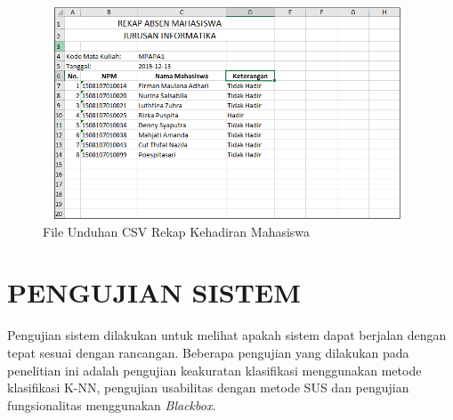 \begin{enumerate}[a.]
		\vspace{-0.2cm}
		\begin{figure}[H]
		\center
		\includegraphics [width = 11cm, height= 6.3cm]{gambar/web/rekap-mahasiswa}
		\caption{File Unduhan CSV Rekap Kehadiran Mahasiswa}
		\label{web-csv-mahasiswa}
		\end{figure}
	
	\end{enumerate}
	
	\section{\uppercase{PENGUJIAN SISTEM}}
	\par Pengujian sistem dilakukan untuk melihat apakah sistem dapat berjalan dengan tepat sesuai dengan rancangan. Beberapa pengujian yang dilakukan pada penelitian ini adalah pengujian keakuratan klasifikasi menggunakan metode klasifikasi K-NN, pengujian usabilitas dengan metode SUS dan pengujian fungsionalitas menggunakan \textit{Blackbox}. 
		
